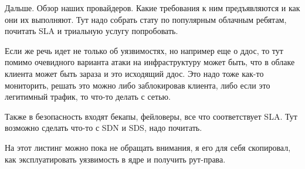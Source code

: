 Дальше.
Обзор наших провайдеров.
Какие требования к ним предъявляются и как они их выполняют.
Тут надо собрать стату по популярным облачным ребятам, почитать SLA и триальную услугу попробовать.

Если же речь идет не только об уязвимостях, но например еще о ддос, то тут помимо очевидного варианта атаки на инфраструктуру может быть, что в облаке клиента может быть зараза и это исходящий ддос.
Это надо тоже как-то мониторить, решать это можно либо заблокировав клиента, либо если это легитимный трафик, то что-то делать с сетью.

Также в безопасность входят бекапы, фейловеры, все что соответствует SLA.
Тут возможно сделать что-то с SDN и SDS, надо почитать.


На этот листинг можно пока не обращать внимания, я его для себя скопировал, как эксплуатировать уязвимость в ядре и получить рут-права.

